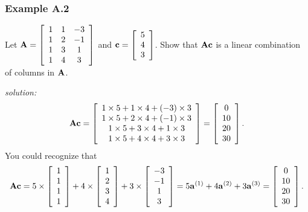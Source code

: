 \subsubsection*{Example A.2}

Let $\mathbf{A} = \left[ \begin{array}{ccc} 1 & 1 & -3 \\1 & 2 & -1 \\1 & 3 & 1 \\1 & 4 & 3 \\ \end{array} \right]$ and $\mathbf{c} = \left[ \begin{array}{c} 5\\4\\3\\ \end{array} \right]$.   Show that $\mathbf{Ac}$ is a linear combination of columns in $\mathbf{A}$.

{\it solution:}
$$
\mathbf{Ac} = \left[ \begin{array}{c} 1 \times 5 + 1 \times 4 + (-3) \times 3 \\ 1 \times 5 + 2 \times 4 + (-1) \times 3 \\ 1 \times 5 + 3 \times 4 + 1 \times 3 \\ 1 \times 5 + 4 \times 4 + 3 \times 3 \\ \end{array}\right] = \left[ \begin{array}{c} 0 \\ 10 \\ 20\\ 30\\ \end{array} \right].
$$
You could recognize that 
$$
\mathbf{Ac} = 5 \times \left[ \begin{array}{c} 1 \\ 1 \\ 1 \\ 1\\ \end{array} \right] + 4 \times \left[ \begin{array}{c} 1 \\ 2 \\ 3 \\ 4\\ \end{array} \right] + 3 \times \left[ \begin{array}{c} -3 \\ -1 \\ 1 \\ 3\\ \end{array} \right] = 5 \mathbf{a}^{(1)} + 4 \mathbf{a}^{(2)} + 3 \mathbf{a}^{(3)}  = \left[ \begin{array}{c} 0 \\ 10 \\ 20\\ 30\\ \end{array} \right].
$$

